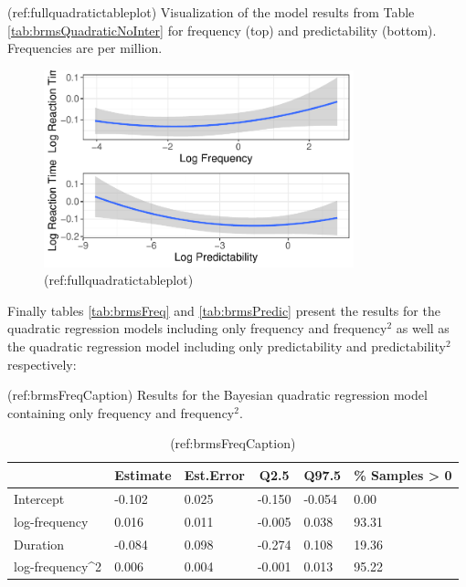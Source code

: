 \documentclass[
  authoryear,
  preprint,
  1p,
  onecolumn]{elsarticle}
\begin{document}
(ref:fullquadratictableplot) Visualization of the model results from
Table \ref{tab:brmsQuadraticNoInter} for frequency (top) and
predictability (bottom). Frequencies are per million.

\begin{figure}[H]

{\centering \includegraphics[width=0.8\textwidth,height=\textheight]{quarto-writeup_files/figure-pdf/FullQuadraticPlot-1.pdf}

}

\caption{(ref:fullquadratictableplot)}

\end{figure}%

Finally tables \ref{tab:brmsFreq} and \ref{tab:brmsPredic} present the
results for the quadratic regression models including only frequency and
frequency\(^2\) as well as the quadratic regression model including only
predictability and predictability\(^2\) respectively:

(ref:brmsFreqCaption) Results for the Bayesian quadratic regression
model containing only frequency and frequency\(^2\).

\begin{table}[H]

\begin{center}
\begin{threeparttable}

\caption{(ref:brmsFreqCaption)}

\begin{tabular}{llllll}
\toprule
 & \multicolumn{1}{c}{Estimate} & \multicolumn{1}{c}{Est.Error} & \multicolumn{1}{c}{Q2.5} & \multicolumn{1}{c}{Q97.5} & \multicolumn{1}{c}{\% Samples > 0}\\
\midrule
Intercept & -0.102 & 0.025 & -0.150 & -0.054 & 0.00\\
log-frequency & 0.016 & 0.011 & -0.005 & 0.038 & 93.31\\
Duration & -0.084 & 0.098 & -0.274 & 0.108 & 19.36\\
log-frequency\textasciicircum{}2 & 0.006 & 0.004 & -0.001 & 0.013 & 95.22\\
\bottomrule
\end{tabular}

\end{threeparttable}
\end{center}

\end{table}
\end{document}
